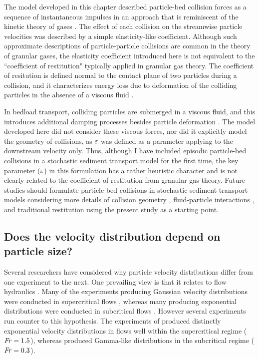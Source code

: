 The model developed in this chapter described particle-bed collision forces as a sequence of instantaneous impulses in an approach that is reminiscent of the kinetic theory of gases \citep{Landau1969}.
The effect of each collision on the streamwise particle velocities was described by a simple elasticity-like coefficient.
Although such approximate descriptions of particle-particle collisions are common in the theory of granular gases, the elasticity coefficient introduced here is not equivalent to the ``coefficient of restitution" typically applied in granular gas theory.
The coefficient of resitution is defined normal to the contact plane of two particles during a collision, and it characterizes energy loss due to deformation of the colliding particles in the absence of a viscous fluid \citep{Brach1992,Ismail2008}.

In bedload transport, colliding particles are submerged in a viscous fluid, and this introduces additional damping processes besides particle deformation \citep{Joseph2001,Yang2006,Schmeeckle2001}.
The model developed here did not consider these viscous forces, nor did it explicitly model the geometry of collisions, as $\varepsilon$ was defined as a parameter applying to the downstream velocity only.
Thus, although I have included episodic particle-bed collisions in a stochastic sediment transport model for the first time, the key parameter ($\varepsilon$) in this formulation has a rather heuristic character and is not clearly related to the coefficient of restitution from granular gas theory.
Future studies should formulate particle-bed collisions in stochastic sediment transport models considering more details of collision geometry \citep{Sekine1992}, fluid-particle interactions \citep{Marshall2011}, and traditional restitution \citep{Brach1989} using the present study as a starting point. 

\subsection{Does the velocity distribution depend on particle size?}

Several researchers have considered why particle velocity distributions differ from one experiment to the next.
One prevailing view is that it relates to flow hydraulics \citep{Wu2020}. Many of the experiments producing Gaussian velocity distributions were conducted in supercritical flows \citep[e.g.][]{Heyman2016,Martin2012,Ancey2014}, whereas many producing exponential distributions were conducted in subcritical flows \citep[e.g.][]{Fathel2015,Charru2004,Seizilles2014}.
However several experiments run counter to this hypothesis.
The experiments of \citet{Lajeunesse2010} produced distinctly exponential velocity distributions in flows well within the supercritical regime ($\mbox{\textit{Fr}}=1.5$), whereas \citet{Liu2019} produced Gamma-like distributions in the subcritical regime ($\mbox{\textit{Fr}}=0.3$).

